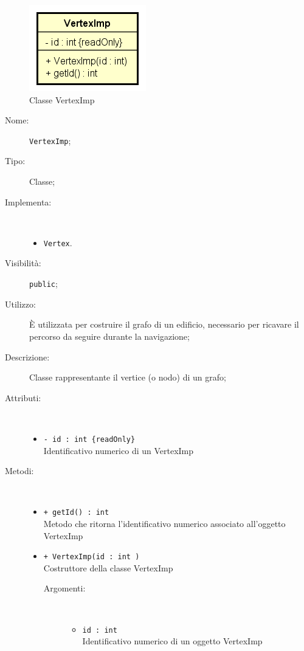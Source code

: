 \documentclass[../DefinizioneDiProdotto.tex]{subfiles}
\begin{document}
    \begin{figure}[H]
        \centering
        \includegraphics{img/VertexImp.png}
        \caption{Classe VertexImp}\label{fig:model::navigator::graph::vertex::VertexImp} 
    \end{figure}
    \begin{description}
\item[Nome:] \texttt{VertexImp};
\item[Tipo:] Classe;
\item[Implementa:] \
\begin{itemize}
\item \texttt{Vertex}.

\end{itemize}
\item[Visibilità:] \texttt{public};
\item[Utilizzo:] È utilizzata per costruire il grafo di un edificio, necessario per ricavare il percorso da seguire durante la navigazione;
\item[Descrizione:] Classe rappresentante il vertice (o nodo) di un grafo;
\item[Attributi:] \
\begin{itemize}
\item \texttt{- id  : int \{readOnly\}}\\
Identificativo numerico di un VertexImp

\end{itemize}
\item[Metodi:] \
\begin{itemize}
\item \texttt{+ getId() : int}\\
Metodo che ritorna l'identificativo numerico associato all'oggetto VertexImp
 \item \texttt{+ VertexImp(id : int )}\\
Costruttore della classe VertexImp
 \begin{description}
\item[Argomenti:] \
\begin{itemize}
\item \texttt{id : int }\\
Identificativo numerico di un oggetto VertexImp\end{itemize}
\end{description}
\end{itemize}
\end{description}
\end{document}
